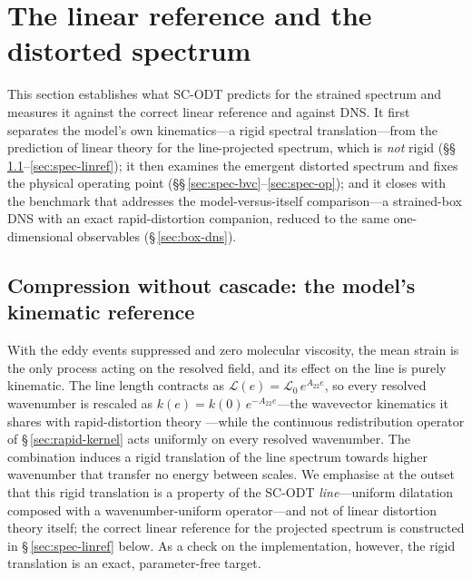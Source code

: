 \documentclass[lineno]{JFM-FLM_Au}
\begin{document}
\section{The linear reference and the distorted spectrum}\label{sec:val-spectrum}

This section establishes what SC-ODT predicts for the strained spectrum
and measures it against the correct linear reference and against DNS.
It first separates the model's own kinematics---a rigid spectral
translation---from the prediction of linear theory for the
line-projected spectrum, which is \emph{not} rigid
(\S\S\,\ref{sec:spec-rdt}--\ref{sec:spec-linref}); it then examines the
emergent distorted spectrum and fixes the physical operating point
(\S\S\,\ref{sec:spec-bvc}--\ref{sec:spec-op}); and it closes with the
benchmark that addresses the model-versus-itself comparison---a
strained-box DNS with an exact rapid-distortion companion, reduced to
the same one-dimensional observables (\S\,\ref{sec:box-dns}).

\subsection{Compression without cascade: the model's kinematic
reference}\label{sec:spec-rdt}

With the eddy events suppressed and zero molecular viscosity, the mean strain
is the only process acting on the resolved field, and its effect on the line
is purely kinematic. The line length contracts as
$\mathcal{L}(e)=\mathcal{L}_0\,e^{A_{22}e}$, so every resolved wavenumber is
rescaled as $k(e)=k(0)\,e^{-A_{22}e}$---the wavevector kinematics it shares
with rapid-distortion theory \citep{BatchelorProudman1954,HuntCarruthers1990}%
---while the continuous redistribution operator of
\S\,\ref{sec:rapid-kernel} acts uniformly on every resolved wavenumber. The
combination induces a rigid translation of the
line spectrum towards higher wavenumber that transfer no energy between scales. We emphasise at the outset that this
rigid translation is a property of the SC-ODT \emph{line}---uniform
dilatation composed with a wavenumber-uniform operator---and not of linear
distortion theory itself; the correct linear reference for the projected
spectrum is constructed in \S\,\ref{sec:spec-linref} below. As a check on the
implementation, however, the rigid translation is an exact, parameter-free
target.
\end{document}
